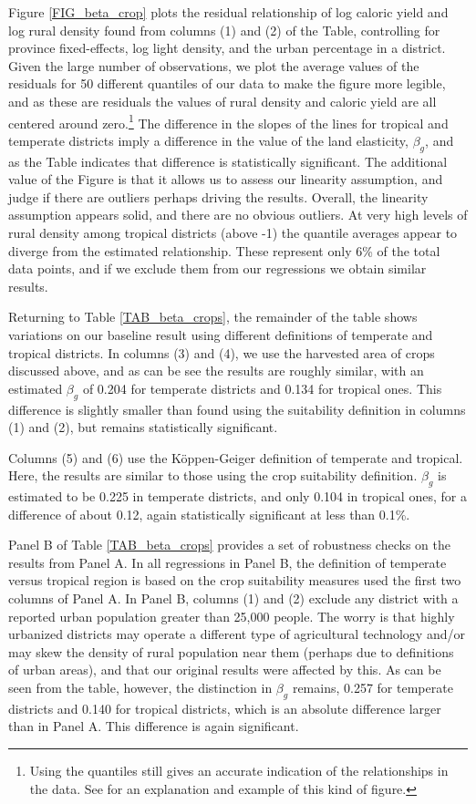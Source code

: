\documentclass[11pt]{article}
\begin{document}
Figure \ref{FIG_beta_crop} plots the residual relationship of log caloric yield and log rural density found from columns (1) and (2) of the Table, controlling for province fixed-effects, log light density, and the urban percentage in a district. Given the large number of observations, we plot the average values of the residuals for 50 different quantiles of our data to make the figure more legible, and as these are residuals the values of rural density and caloric yield are all centered around zero.\footnote{Using the quantiles still gives an accurate indication of the relationships in the data. See \citet{cfs2013} for an explanation and example of this kind of figure.} The difference in the slopes of the lines for tropical and temperate districts imply a difference in the value of the land elasticity, $\beta_g$, and as the Table indicates that difference is statistically significant. The additional value of the Figure is that it allows us to assess our linearity assumption, and judge if there are outliers perhaps driving the results. Overall, the linearity assumption appears solid, and there are no obvious outliers. At very high levels of rural density among tropical districts (above -1) the quantile averages appear to diverge from the estimated relationship. These represent only 6\% of the total data points, and if we exclude them from our regressions we obtain similar results.

Returning to Table \ref{TAB_beta_crops}, the remainder of the table shows variations on our baseline result using different definitions of temperate and tropical districts. In columns (3) and (4), we use the harvested area of crops discussed above, and as can be see the results are roughly similar, with an estimated $\beta_g$ of 0.204 for temperate districts and 0.134 for tropical ones. This difference is slightly smaller than found using the suitability definition in columns (1) and (2), but remains statistically significant.

Columns (5) and (6) use the K{\"o}ppen-Geiger definition of temperate and tropical. Here, the results are similar to those using the crop suitability definition. $\beta_g$ is estimated to be 0.225 in temperate districts, and only 0.104 in tropical ones, for a difference of about 0.12, again statistically significant at less than 0.1\%.

Panel B of Table \ref{TAB_beta_crops} provides a set of robustness checks on the results from Panel A. In all regressions in Panel B, the definition of temperate versus tropical region is based on the crop suitability measures used the first two columns of Panel A. In Panel B, columns (1) and (2) exclude any district with a reported urban population greater than 25,000 people. The worry is that highly urbanized districts may operate a different type of agricultural technology and/or may skew the density of rural population near them (perhaps due to definitions of urban areas), and that our original results were affected by this. As can be seen from the table, however, the distinction in $\beta_g$ remains, 0.257 for temperate districts and 0.140 for tropical districts, which is an absolute difference larger than in Panel A. This difference is again significant.
\end{document}
